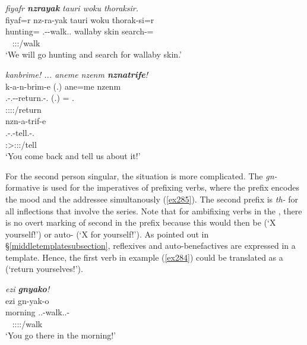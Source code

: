 \begin{exe}
	\ex \emph{fiyafr \textbf{nzrayak} tauri woku thoraksir.}\\
	\glll fiyaf=r nz-ra-yak tauri woku thorak-si=r\\
	hunting={\Purp} \Fnsg.\Bet-\Irr-walk.\Ext.{\Ndu} wallaby skin search-\Nmlz={\Purp}\\
	~ {\footnotesize \Fpl:\Sbj:\Irr:\Ipfv/walk} ~ ~ ~\\
	\trans `We will go hunting and search for wallaby skin.' 
	\label{ex283}
\end{exe}
\begin{exe}
	\ex \emph{kanbrime! ... aneme nzenm \textbf{nznatrife}!}\\
	\glll k-a-n-brim-e (.) ane=me nzenm\\
	\M.\Bet-\Vc.\Du-\Venit-return.\Rs-\Snsg.{\Imp} (.) \Dem={\Ins} \Fnsg.{\Dat}\\
	{\footnotesize \Sdu:\Sbj:\Imp:\Pfv:\Venit/return} ~ ~ ~\\
	\sn
	\glll nzn-a-trif-e\\
	\Fnsg.\Bet-\Vc.\Du-tell.\Rs-\Snsg.{\Imp}\\
	{\footnotesize \Sdu:\Sbj>\Fdu:\Obj:\Imp:\Pfv/tell}\\
	\trans `You come back and tell us about it!' 
	\label{ex284}
\end{exe}

For the second person singular, the situation is more complicated. The \emph{gn-} formative is used for the imperatives of prefixing verbs, where the prefix encodes the  mood and the addressee simultanously (\ref{ex285}). The second  prefix is \emph{th-} for all inflections that involve the \Bet{} series. Note that for ambifixing verbs in the , there is no overt marking of second  in the prefix because this would then be  (`X yourself!') or auto- (`X for yourself!'). As pointed out in {\S}\ref{middletemplatesubsection}, reflexives and auto-benefactives are expressed in a  template. Hence, the first verb in example (\ref{ex284}) could be translated as a  (`return yourselves!').

\begin{exe}
	\ex \emph{ezi \textbf{gnyako}!}\\
	\glll ezi gn-yak-o\\
	morning \Ssg.\Bet.\Imp-walk.\Ext.\Ndu-\Andat\\
	~ {\footnotesize \Ssg:\Sbj:\Imp:\Ipfv:\Andat/walk}\\
	\trans `You go there in the morning!' 
	\label{ex285}
\end{exe}

